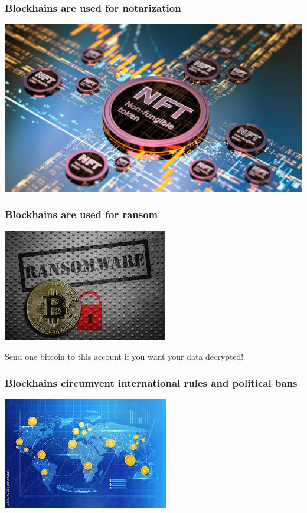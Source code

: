 \documentclass[11pt]{beamer}  %
\begin{document}
\begin{frame}\frametitle{Blockhains are used for notarization}

  \begin{center}
    \includegraphics[scale=0.258,clip=false]{pictures/nft.jpg}
  \end{center}

\end{frame}

\begin{frame}\frametitle{Blockhains are used for ransom}

  \begin{center}
    \includegraphics[scale=0.7, clip=false]{pictures/ransom.jpg}
  \end{center}

  \begin{redbox}{}
    Send one bitcoin to this account if you want your data decrypted!
  \end{redbox}

\end{frame}

\begin{frame}\frametitle{Blockhains circumvent international rules and political bans}

  \begin{center}
    \includegraphics[scale=1, clip=false]{pictures/send-money.jpg}
  \end{center}

\end{frame}
\end{document}
